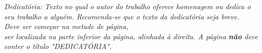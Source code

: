 
\begin{dedicatoria}
\clearpage 

\vspace*{\fill}
\hspace*{7 cm}
\begin{minipage}{8.5 cm}
\begin{flushright} 
    \textit{Dedicatória: Texto no qual o autor do trabalho oferece homenagem ou dedica o seu trabalho a alguém. Recomenda-se que o texto da dedicatória seja breve.} \\
    \textit{Deve ser começar na metade de página,} \\
    \textit{ser localizada na parte inferior da página, alinhada à direita. A página \textbf{não} deve conter o título "DEDICATÓRIA".}
\end{flushright}
\end{minipage}

\clearpage
\end{dedicatoria}